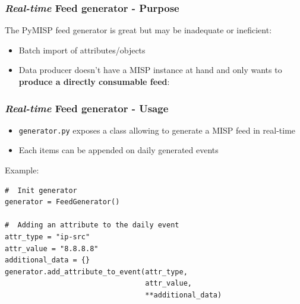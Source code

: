 \begin{frame}
        \frametitle{{\it Real-time} Feed generator - Purpose}
    The PyMISP feed generator is great but may be inadequate or ineficient:
    \begin{itemize}
        \item Batch import of attributes/objects
        \item Data producer doesn't have a MISP instance at hand and only wants to {\bf produce a directly consumable feed}:
    \end{itemize}

    \vspace{15px}
    \begin{center}
    \end{center}
\end{frame}

\begin{frame}[fragile]
        \frametitle{{\it Real-time} Feed generator - Usage}
    \begin{itemize}
        \item \texttt{generator.py} exposes a class allowing to generate a MISP feed in real-time
        \item Each items can be appended on daily generated events
    \end{itemize}

    Example:
    \begin{lstlisting}
#  Init generator
generator = FeedGenerator()

#  Adding an attribute to the daily event
attr_type = "ip-src"
attr_value = "8.8.8.8"
additional_data = {}
generator.add_attribute_to_event(attr_type, 
                                 attr_value, 
                                 **additional_data)
\end{lstlisting}
\end{frame}

